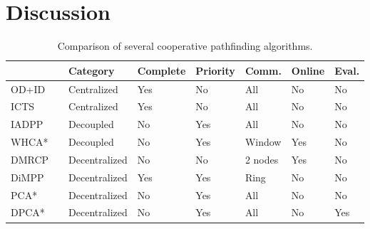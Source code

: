 \section{Discussion}\label{sec:discussion}
\begin{table*}[h]
    \centering
    \caption{Comparison of several cooperative pathfinding algorithms.}
    \label{tbl:planning-overview}
    \begin{tabular}{ll|l|l|l|l|l|l}
        & & Category & Complete & Priority & Comm. & Online & Eval. \\
        \hline
        OD+ID & \citep{standley2010,standley2011} & Centralized & Yes & No &
        All &
        No & No \\
        ICTS & \citep{sharon2013} & Centralized & Yes & No & All & No & No\\
        IADPP & \citep{cap2012} & Decoupled & No & Yes & All & No & No \\
        WHCA* & \citep{silver2005} & Decoupled & No & Yes & Window & Yes & No \\
        DMRCP & \citep{wei2016} & Decentralized & No & No & 2 nodes & Yes & No
        \\
        DiMPP & \citep{chouhan2017} & Decentralized & Yes & Yes & Ring & No & 
        No
        \\ \hline
        PCA* & & Decentralized & No & Yes & All & No & No \\
        DPCA* & & Decentralized & No & Yes & All & No & Yes
    \end{tabular}
\end{table*}


